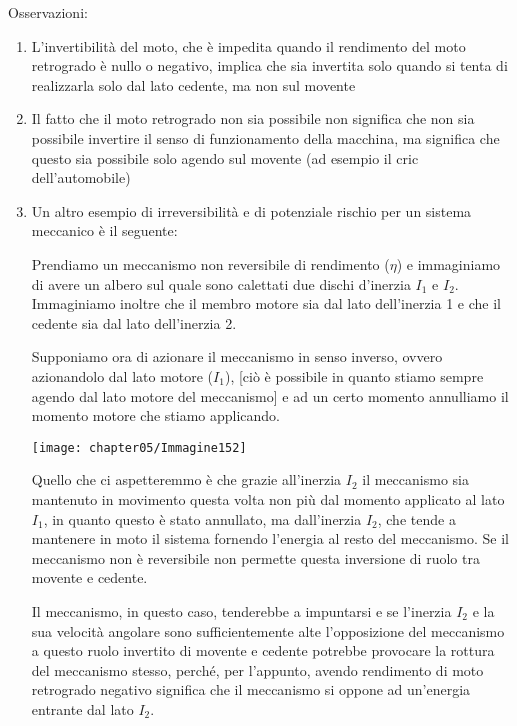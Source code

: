 Osservazioni:
\begin{enumerate}[$\rightarrow$]
\item L'invertibilità del moto, che è impedita quando il rendimento del moto retrogrado è nullo o negativo, implica che sia invertita solo quando si tenta di realizzarla solo dal lato cedente, ma non sul movente 
\item  Il fatto che il moto retrogrado non sia possibile non significa che non sia possibile invertire il senso di funzionamento della macchina, ma significa che questo sia possibile solo agendo sul movente (ad esempio il cric dell'automobile)
\item Un altro esempio di irreversibilità e di potenziale rischio per un sistema meccanico è il seguente:

\begin{minipage}{.5\textwidth}
Prendiamo un meccanismo non reversibile di rendimento ($\eta$) e immaginiamo di avere un albero sul quale sono calettati due dischi d'inerzia $I_1$ e $I_2$. Immaginiamo inoltre che il membro motore sia dal lato dell'inerzia 1 e che il cedente sia dal lato dell'inerzia 2. \newline

Supponiamo ora di azionare il meccanismo in senso inverso, ovvero azionandolo dal lato motore ($I_1$), [ciò è possibile in quanto stiamo sempre agendo dal lato motore del meccanismo] e ad un certo momento annulliamo il momento motore che stiamo applicando.

\end{minipage}
\hfill
\begin{minipage}{.5\textwidth}
\centering
\texttt{[image: chapter05/Immagine152]}
\end{minipage}

Quello che ci aspetteremmo è che grazie all'inerzia $I_2$ il meccanismo sia mantenuto in movimento questa volta non più dal momento applicato al lato $I_1$, in quanto questo è stato annullato, ma dall'inerzia $I_2$, che tende a mantenere in moto il sistema fornendo l'energia al resto del meccanismo. Se il meccanismo non è reversibile non permette questa inversione di ruolo tra movente e cedente.

Il meccanismo, in questo caso, tenderebbe a impuntarsi e se l'inerzia $I_2$ e la sua velocità angolare sono sufficientemente alte l'opposizione del meccanismo a questo ruolo invertito di movente e cedente potrebbe provocare la rottura del meccanismo stesso, perché, per l'appunto, avendo rendimento di moto retrogrado negativo significa che il meccanismo si oppone ad un'energia entrante dal lato $I_2$.
\end{enumerate}

